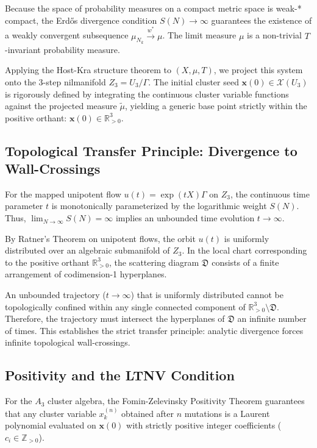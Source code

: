 \documentclass[11pt, a4paper, reqno]{amsart}
\theoremstyle{definition}
\newcommand{\R}{\mathbb{R}}
\newcommand{\Z}{\mathbb{Z}}
\begin{document}
Because the space of probability measures on a compact metric space is weak-* compact, the Erd\H{o}s divergence condition $S(N) \to \infty$ guarantees the existence of a weakly convergent subsequence $\mu_{N_k} \xrightarrow{w^*} \mu$. The limit measure $\mu$ is a non-trivial $T$-invariant probability measure.

Applying the Host-Kra structure theorem \cite{HostKra2005} to $(X, \mu, T)$, we project this system onto the 3-step nilmanifold $Z_3 = U_3/\Gamma$. The initial cluster seed $\mathbf{x}(0) \in \mathcal{X}(U_3)$ is rigorously defined by integrating the continuous cluster variable functions against the projected measure $\tilde{\mu}$, yielding a generic base point strictly within the positive orthant: $\mathbf{x}(0) \in \R_{>0}^3$.

\subsection{Topological Transfer Principle: Divergence to Wall-Crossings}
For the mapped unipotent flow $u(t) = \exp(tX)\Gamma$ on $Z_3$, the continuous time parameter $t$ is monotonically parameterized by the logarithmic weight $S(N)$. Thus, $\lim_{N \to \infty} S(N) = \infty$ implies an unbounded time evolution $t \to \infty$.

By Ratner's Theorem on unipotent flows, the orbit $u(t)$ is uniformly distributed over an algebraic submanifold of $Z_3$. In the local chart corresponding to the positive orthant $\R_{>0}^3$, the scattering diagram $\mathfrak{D}$ consists of a finite arrangement of codimension-1 hyperplanes. 

An unbounded trajectory ($t \to \infty$) that is uniformly distributed cannot be topologically confined within any single connected component of $\R_{>0}^3 \setminus \mathfrak{D}$. Therefore, the trajectory must intersect the hyperplanes of $\mathfrak{D}$ an infinite number of times. This establishes the strict transfer principle: analytic divergence forces infinite topological wall-crossings.

\subsection{Positivity and the LTNV Condition}
For the $A_3$ cluster algebra, the Fomin-Zelevinsky Positivity Theorem \cite{FominZelevinsky2002} guarantees that any cluster variable $x_k^{(n)}$ obtained after $n$ mutations is a Laurent polynomial evaluated on $\mathbf{x}(0)$ with strictly positive integer coefficients ($c_i \in \Z_{>0}$).
\end{document}
